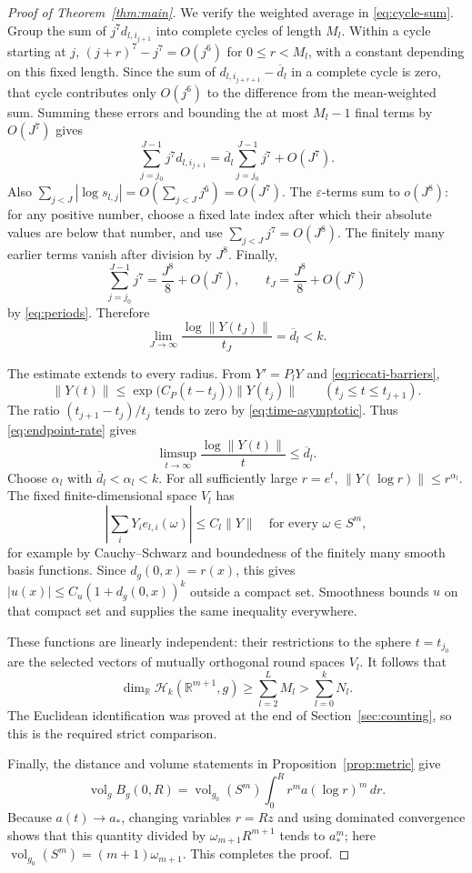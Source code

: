\begin{proof}[Proof of Theorem~\ref{thm:main}]
We verify the weighted average in \eqref{eq:cycle-sum}.  Group
the sum of \(j^7d_{l,i_{j+1}}\) into complete cycles of length
\(M_l\).  Within a cycle starting at \(j\),
\((j+r)^7-j^7=O(j^6)\) for \(0\leq r<M_l\), with a constant
depending on this fixed length.  Since the sum of
\(d_{l,i_{j+r+1}}-\overline d_l\) in a complete cycle is zero,
that cycle contributes only \(O(j^6)\) to the difference from
the mean-weighted sum.  Summing these errors and bounding the
at most \(M_l-1\) final terms by \(O(J^7)\) gives
\[
 \sum_{j=j_0}^{J-1}j^7d_{l,i_{j+1}}
 =\overline d_l\sum_{j=j_0}^{J-1}j^7+O(J^7).
\]
Also \(\sum_{j<J}|\log s_{l,j}|=O(\sum_{j<J}j^6)=O(J^7)\).
The \(\varepsilon\)-terms sum to \(o(J^8)\): for any positive
number, choose a fixed late index after which their absolute
values are below that number, and use
\(\sum_{j<J}j^7=O(J^8)\).  The finitely many earlier terms
vanish after division by \(J^8\).  Finally,
\[
 \sum_{j=j_0}^{J-1}j^7=\frac{J^8}{8}+O(J^7),\qquad
 t_J=\frac{J^8}{8}+O(J^7)
\]
by \eqref{eq:periods}.  Therefore
\begin{equation}
 \lim_{J\to\infty}\frac{\log\|Y(t_J)\|}{t_J}
 =\overline d_l<k.
 \label{eq:endpoint-rate}
\end{equation}

The estimate extends to every radius.  From \(Y'=P_lY\) and
\eqref{eq:riccati-barriers},
\[
 \|Y(t)\|\leq
 \exp\bigl(C_P(t-t_j)\bigr)\|Y(t_j)\|
 \qquad(t_j\leq t\leq t_{j+1}).
\]
The ratio \((t_{j+1}-t_j)/t_j\) tends to zero by
\eqref{eq:time-asymptotic}.  Thus \eqref{eq:endpoint-rate} gives
\[
 \limsup_{t\to\infty}\frac{\log\|Y(t)\|}{t}
 \leq\overline d_l.
\]
Choose \(\alpha_l\) with
\(\overline d_l<\alpha_l<k\).  For all sufficiently large
\(r=e^t\), \(\|Y(\log r)\|\leq r^{\alpha_l}\).
The fixed finite-dimensional space \(V_l\) has
\[
 \left|\sum_iY_i e_{l,i}(\omega)\right|\leq C_l\|Y\|
 \quad\text{for every }\omega\in S^m,
\]
for example by Cauchy--Schwarz and boundedness of the finitely
many smooth basis functions.  Since \(d_g(0,x)=r(x)\), this
gives \(|u(x)|\leq C_u(1+d_g(0,x))^k\) outside a compact set.
Smoothness bounds \(u\) on that compact set and supplies the
same inequality everywhere.

These functions are linearly independent: their restrictions
to the sphere \(t=t_{j_0}\) are the selected vectors of
mutually orthogonal round spaces \(V_l\).  It follows that
\[
 \dim_{\mathbb R}\mathcal H_k(\mathbb R^{m+1},g)
 \geq\sum_{l=2}^{L}M_l>\sum_{l=0}^{k}N_l.
\]
The Euclidean identification was proved at the end of
Section~\ref{sec:counting}, so this is the required strict comparison.

Finally, the distance and volume statements in Proposition~\ref{prop:metric} give
\[
 \operatorname{vol}_g B_g(0,R)
 =\operatorname{vol}_{g_0}(S^m)
       \int_0^R r^m a(\log r)^m\,dr.
\]
Because \(a(t)\to a_*\), changing variables \(r=Rz\) and
using dominated convergence shows that this quantity divided
by \(\omega_{m+1}R^{m+1}\) tends to \(a_*^m\); here
\(\operatorname{vol}_{g_0}(S^m)=(m+1)\omega_{m+1}\).
This completes the proof.
\end{proof}

